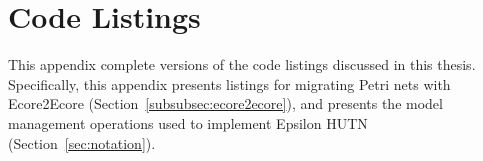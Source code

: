 
\chapter{Code Listings}
\label{CodeListings}

This appendix complete versions of the code listings discussed in this thesis. Specifically, this appendix presents listings for migrating Petri nets with Ecore2Ecore (Section~\ref{subsubsec:ecore2ecore}), and presents the model management operations used to implement Epsilon HUTN (Section~\ref{sec:notation}).



